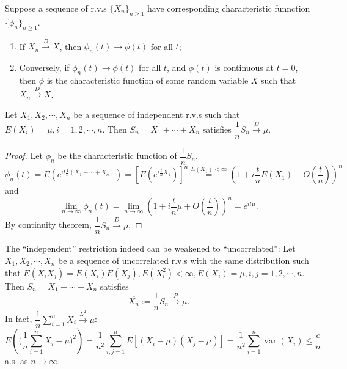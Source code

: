 \documentclass[11pt,singlecolumn, openany, citestyle=authoryear]{elegantbook}
\begin{document}
\begin{CJK}{UTF8}{gbsn}
\begin{theorem}[Continuity]
    Suppose a sequence of r.v.s $\{X_n\}_{n\geqslant 1}$ have corresponding characteristic
    funnction $\{\phi_n\}_{n\geqslant 1}$. 
    \begin{enumerate}
        \item If $X_n \overset{D}{\longrightarrow}X$, then $\phi_n(t)\to \phi(t)$ for all $t$;
        \item Conversely, if $\phi_n(t)\to\phi(t)$ for all $t$, 
        and $\phi(t)$ is continuous at $t=0$,
        then $\phi$ is the characteristic function of some random variable $X$ such that 
        $X_n \overset{D}{\longrightarrow}X$.
    \end{enumerate}
\end{theorem}
\begin{theorem}
    Let $X_1,X_2,\cdots,X_n$ be a sequence of independent r.v.s such that $E(X_i)=\mu,
    i=1,2,\cdots,n$.
    Then $S_n=X_1+\cdots+X_n$ satisfies $\dfrac{1}{n}S_n \overset{D}{\longrightarrow}\mu$.
\end{theorem}
\begin{proof}
    Let $\phi_n$ be the characteristic function of $\dfrac{1}{n}S_n$. 
    $$
    \phi_n(t)=E(e^{it\frac{1}{n}(X_1+\cdots+X_n)})=[E(e^{i\frac{t}{n}X_1})]^n 
    \overset{E(X_1)<\infty}{=}\left(
        1+i \frac{t}{n}E(X_1)+O\left(\frac{t}{n}\right)
    \right)^n
    $$
    and 
    $$
    \lim_{n\to\infty}\phi_n(t)=\lim_{n\to\infty}\left(
        1+i\frac{t}{n}\mu+O\left(\frac{t}{n}\right)
    \right)^n = e^{it\mu}.
    $$
    By continuity theorem, $\dfrac{1}{n}S_n\overset{D}{\longrightarrow}\mu$.
\end{proof}
\begin{note}
    The ``independent'' restriction indeed can be weakened to ``uncorrelated'':
    Let $X_1,X_2,\cdots,X_n$ be a sequence of uncorrelated r.v.s 
    with the same distribution such that $E(X_iX_j)=E(X_i)E(X_j),E(X_i^2)<\infty,
    E(X_i)=\mu, i,j=1,2,\cdots,n$.
    Then $S_n=X_1+\cdots+X_n$ satisfies 
    $$\overline{X_n}:=\dfrac{1}{n}S_n \overset{P}{\longrightarrow}\mu.$$
    In fact, $\dfrac{1}{n}\displaystyle \sum_{i=1}^n
        X_i \overset{L^2}{\longrightarrow} \mu$:
        $$
        E\left(
            \bigg(\frac{1}{n}\sum_{i=1}^n X_i-\mu\bigg)^2
        \right)= 
        \frac{1}{n^2}\sum_{i,j=1}^nE[(X_i-\mu)(X_j-\mu)]=\frac{1}{n^2}
        \sum_{i=1}^n \operatorname{var}(X_i) \leqslant \frac{c}{n}
        $$
        a.s. as $n\to \infty$.
\end{note}


\end{CJK}
\end{document}
